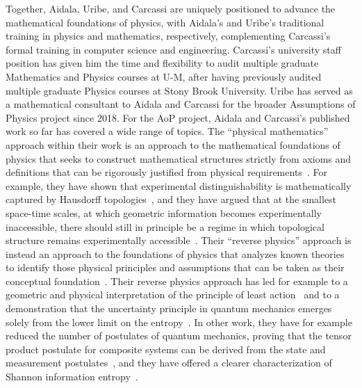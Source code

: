Together, Aidala, Uribe, and Carcassi are uniquely positioned to advance the mathematical foundations of physics, with Aidala's and Uribe's traditional training in physics and mathematics, respectively, complementing Carcassi's formal training in computer science and engineering.  Carcassi's university staff position has given him the time and flexibility to audit multiple graduate Mathematics and Physics courses at U-M, after having previously audited multiple graduate Physics courses at Stony Brook University.  Uribe has served as a mathematical consultant to Aidala and Carcassi for the broader Assumptions of Physics project since 2018.  For the AoP project, Aidala and Carcassi's published work so far has covered a wide range of topics.  The ``physical mathematics'' approach within their work is an approach to the mathematical foundations of physics that seeks to construct mathematical structures strictly from axioms and definitions that can be rigorously justified from physical requirements~\cite{aop-book}.  For example, they have shown that experimental distinguishability is mathematically captured by Hausdorff topologies~\cite{aop-book,aop-topExpDisting}, and they have argued that at the smallest space-time scales, at which geometric information becomes experimentally inaccessible, there should still in principle be a regime in which topological structure remains experimentally accessible~\cite{aop-spacetimeStruct}.  Their ``reverse physics'' approach is instead an approach to the foundations of physics that analyzes known theories to identify those physical principles and assumptions that can be taken as their conceptual foundation~\cite{aop-book,Carcassi:2022bpm}. Their reverse physics approach has led for example to a geometric and physical interpretation of the principle of least action~\cite{aop-action} and to a demonstration that the uncertainty principle in quantum mechanics emerges solely from the lower limit on the entropy~\cite{Carcassi:2022bpm}. In other work, they have for example reduced the number of postulates of quantum mechanics, proving that the tensor product postulate for composite systems can be derived from the state and measurement postulates~\cite{Carcassi2021four}, and they have offered a clearer characterization of Shannon information entropy~\cite{Carcassi:2021}. 

